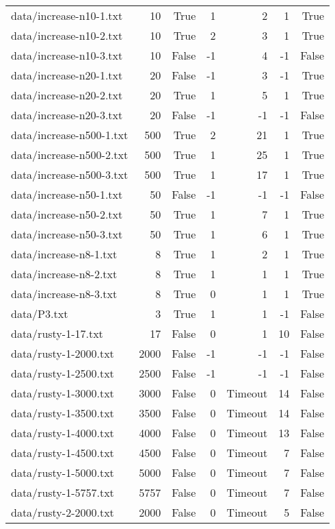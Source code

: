\begin{tabular}{lrrrrrr}
data/increase-n10-1.txt & 10 & True & 1 & 2 & 1 & True \\
data/increase-n10-2.txt & 10 & True & 2 & 3 & 1 & True \\
data/increase-n10-3.txt & 10 & False & -1 & 4 & -1 & False \\
data/increase-n20-1.txt & 20 & False & -1 & 3 & -1 & True \\
data/increase-n20-2.txt & 20 & True & 1 & 5 & 1 & True \\
data/increase-n20-3.txt & 20 & False & -1 & -1 & -1 & False \\
data/increase-n500-1.txt & 500 & True & 2 & 21 & 1 & True \\
data/increase-n500-2.txt & 500 & True & 1 & 25 & 1 & True \\
data/increase-n500-3.txt & 500 & True & 1 & 17 & 1 & True \\
data/increase-n50-1.txt & 50 & False & -1 & -1 & -1 & False \\
data/increase-n50-2.txt & 50 & True & 1 & 7 & 1 & True \\
data/increase-n50-3.txt & 50 & True & 1 & 6 & 1 & True \\
data/increase-n8-1.txt & 8 & True & 1 & 2 & 1 & True \\
data/increase-n8-2.txt & 8 & True & 1 & 1 & 1 & True \\
data/increase-n8-3.txt & 8 & True & 0 & 1 & 1 & True \\
data/P3.txt & 3 & True & 1 & 1 & -1 & False \\
data/rusty-1-17.txt & 17 & False & 0 & 1 & 10 & False \\
data/rusty-1-2000.txt & 2000 & False & -1 & -1 & -1 & False \\
data/rusty-1-2500.txt & 2500 & False & -1 & -1 & -1 & False \\
data/rusty-1-3000.txt & 3000 & False & 0 & Timeout & 14 & False \\
data/rusty-1-3500.txt & 3500 & False & 0 & Timeout & 14 & False \\
data/rusty-1-4000.txt & 4000 & False & 0 & Timeout & 13 & False \\
data/rusty-1-4500.txt & 4500 & False & 0 & Timeout & 7 & False \\
data/rusty-1-5000.txt & 5000 & False & 0 & Timeout & 7 & False \\
data/rusty-1-5757.txt & 5757 & False & 0 & Timeout & 7 & False \\
data/rusty-2-2000.txt & 2000 & False & 0 & Timeout & 5 & False \\

\end{tabular}

